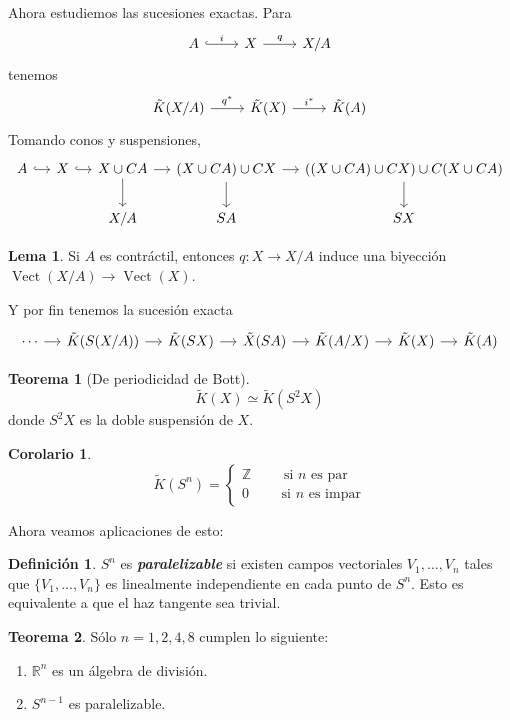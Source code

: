 \documentclass[spanish]{book}
\theoremstyle{definition}
\newtheorem*{defn}{Definición}
\newtheorem*{lema}{Lema}
\newtheorem*{teo}{Teorema}
\newtheorem*{coro}{Corolario}
\newcommand{\R}{\mathbb{R}}
\newcommand{\Z}{\mathbb{Z}}
\begin{document}
Ahora estudiemos las sucesiones exactas.
Para 
\[\begin{tikzcd}
	A\arrow[hook,r,"i"]&X\arrow[r,"q"]&X/A
\end{tikzcd}\]
tenemos
\[\begin{tikzcd}
	\tilde{K}(X/A)\arrow[r,"q^*"]&\tilde{K}(X)\arrow[r,"i^*"]&\tilde{K}(A)
\end{tikzcd}\]
Tomando conos y suspensiones,
\[\begin{tikzcd}[column sep=small]
	A\arrow[r,hook]&X\arrow[r,hook]&X\cup CA\arrow[r]\arrow[d]&(X\cup CA)\cup CX\arrow[d]\arrow[r]&((X\cup CA)\cup CX)\cup C(X\cup CA)\arrow[d]\\
	&&X/A&SA&SX
\end{tikzcd}\]
\begin{lema}
	Si $A$ es contráctil, entonces $q:X\to X/A$ induce una biyección $\operatorname{Vect}(X/A)\to\operatorname{Vect}(X)$.
\end{lema}
Y por fin tenemos la sucesión exacta
\[\begin{tikzcd}[column sep=small]
	\cdots\arrow[r]&\tilde{K}(S(X/A))\arrow[r]&\tilde{K}(SX)\arrow[r]&\tilde{X}(SA)\arrow[r]&\tilde{K}(A/X)\arrow[r]&\tilde{K}(X)\arrow[r]&\tilde{K}(A)
\end{tikzcd}\]
\begin{teo}[De periodicidad de Bott]
	\[\tilde{K}(X)\simeq\tilde{K}(S^2X)\]
	donde $S^2X$ es la doble suspensión de $X$.
\end{teo}
\begin{coro}
	\[\tilde{K}(S^n)=\begin{cases}
		\Z\qquad\text{ si }n\text{ es par}\\
		0\qquad\text{ si }n\text{ es impar}
	\end{cases}\]
\end{coro}

Ahora veamos aplicaciones de esto:
\begin{defn}
	$S^n$ es \textbf{\textit{paralelizable}} si existen campos vectoriales $V_1,\ldots,V_n$ tales que $\{V_1,\ldots,V_n\}$ es linealmente independiente en cada punto de $S^n$. Esto es equivalente a que el haz tangente sea trivial.
\end{defn}

\begin{teo}
	Sólo $n=1,2,4,8$ cumplen lo siguiente:
	\begin{enumerate}
		\item $\R^n$ es un álgebra de división.
		\item $S^{n-1}$ es paralelizable.
	\end{enumerate}
\end{teo}
\end{document}
